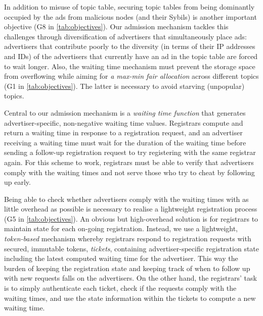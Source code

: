 In addition to misuse of topic table, securing topic tables from being dominantly occupied by the ads from malicious nodes (and their Sybils) is another important objective (G8 in \cref{tab:objectives}). Our admission mechanism tackles this challenges through diversification of advertisers that simultaneously place ads: advertisers that contribute poorly to the diversity (in terms of their IP addresses and IDs) of the advertisers that currently have an ad in the topic table are forced to wait longer. Also, the waiting time mechanism must prevent the storage space from overflowing while aiming for \textit{a max-min fair allocation} across different topics (G1 in \cref{tab:objectives}). The latter is necessary to avoid starving (unpopular) topics. %


Central to our admission mechanism is a \textit{waiting time function} that generates advertiser-specific, non-negative waiting time values. Registrars compute and return a waiting time in response to a registration request, and an advertiser receiving a waiting time must wait for the duration of the waiting time before sending a follow-up registration request to try registering with the same registrar again. For this scheme to work, registrars must be able to verify that advertisers comply with the waiting times and not serve those who try to cheat by following up early. 

Being able to check whether advertisers comply with the waiting times with as little overhead as possible is necessary to realise a lightweight registration process (G5 in \cref{tab:objectives}).  
An obvious but high-overhead solution is for registrars to maintain state for each on-going registration. %
Instead, we use a lightweight, \textit{token-based} mechanism whereby registrars respond to registration requests with secured, immutable tokens, \ie \textit{tickets}, containing advertiser-specific registration state including the latest computed waiting time for the advertiser. This way the burden of keeping the registration state and keeping track of when to follow up with new requests falls on the advertisers. On the other hand, the registrars' task is to simply authenticate each ticket, check if the requests comply with the waiting times, and use the state information within the tickets to compute a new waiting time.  

